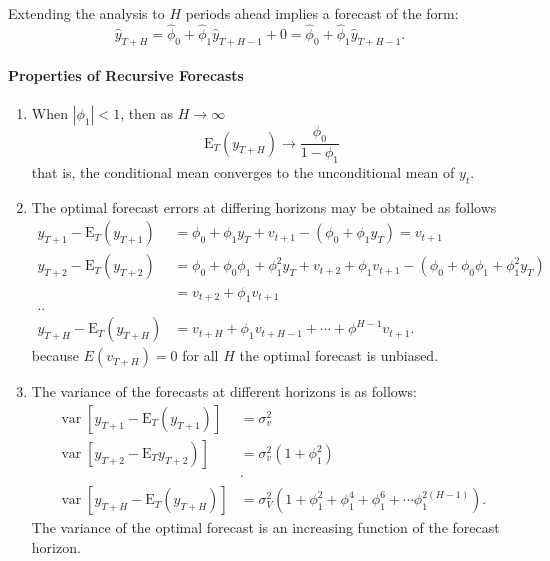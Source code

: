 \documentclass[11pt]{article}
\begin{document}
Extending the analysis to $H$ periods ahead implies a forecast of the form:
\begin{equation}
\widehat{y}_{T+H}=\widehat{\phi}_0+\widehat{\phi}_1 \widehat{y}_{T+H-1}+0=\widehat{\phi}_0+\widehat{\phi}_1 \widehat{y}_{T+H-1} .
\end{equation}

\paragraph{Properties of Recursive Forecasts}\mbox{}
\begin{enumerate}
    \item When $|\phi_1|<1$, then as $H\rightarrow\infty$
    \begin{equation}
\mathrm{E}_T\left(y_{T+H}\right) \rightarrow \frac{\phi_0}{1-\phi_1}
\end{equation}
that is, the conditional mean converges to the unconditional mean of $y_t$.

\item The optimal forecast errors at differing horizons may be obtained as follows
\begin{equation}
\begin{aligned}
y_{T+1}-\mathrm{E}_T\left(y_{T+1}\right) & =\phi_0+\phi_1 y_T+v_{t+1}-\left(\phi_0+\phi_1 y_T\right)=v_{t+1} \\
y_{T+2}-\mathrm{E}_T\left(y_{T+2}\right) & =\phi_0+\phi_0 \phi_1+\phi_1^2 y_T+v_{t+2}+\phi_1 v_{t+1}-\left(\phi_0+\phi_0 \phi_1+\phi_1^2 y_T\right) \\
& =v_{t+2}+\phi_1 v_{t+1} \\
. . & \\
y_{T+H}-\mathrm{E}_T\left(y_{T+H}\right) & =v_{t+H}+\phi_1 v_{t+H-1}+\cdots+\phi^{H-1} v_{t+1} .
\end{aligned}
\end{equation}
because $E(v_{T+H})=0$ for all $H$ the optimal forecast is unbiased.

\item The variance of the forecasts at different horizons is as follows:
\begin{equation}
\begin{aligned}
\operatorname{var}\left[y_{T+1}-\mathrm{E}_T\left(y_{T+1}\right)\right] & =\sigma_v^2 \\
\left.\operatorname{var}\left[y_{T+2}-\mathrm{E}_T y_{T+2}\right)\right] & =\sigma_v^2\left(1+\phi_1^2\right) \\
& \cdot \\
\operatorname{var}\left[y_{T+H}-\mathrm{E}_T\left(y_{T+H}\right)\right] & =\sigma_V^2\left(1+\phi_1^2+\phi_1^4+\phi_1^6+\cdots \phi_1^{2(H-1)}\right) .
\end{aligned}
\end{equation}
The variance of the optimal forecast is an increasing function of the forecast horizon.
\end{enumerate}
\end{document}
